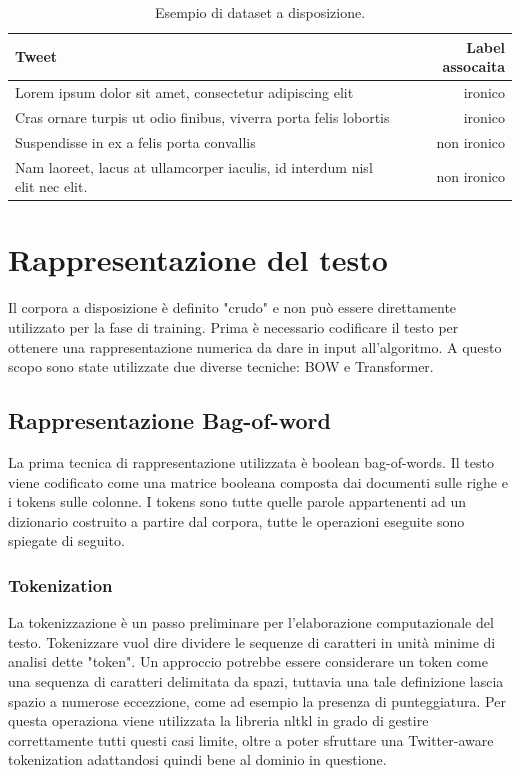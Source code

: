 \documentclass[oneside]{book}
\begin{document}
\begin{table}[h!]
	\centering
	\begin{tabular}[t]{lr}
		\hline
		\textbf{Tweet} & \textbf{Label assocaita}\\
		\hline
		Lorem ipsum dolor sit amet, consectetur adipiscing elit & ironico     \\
		Cras ornare turpis ut odio finibus, viverra porta felis lobortis & ironico \\
		Suspendisse in ex a felis porta convallis & non ironico \\
		Nam laoreet, lacus at ullamcorper iaculis, id interdum nisl elit nec elit. & non ironico \\
		
		\hline
	\end{tabular}
	\caption{Esempio di dataset a disposizione.}
\end{table}%




\section{Rappresentazione del testo}
Il corpora a disposizione è definito "crudo" e non può essere direttamente utilizzato per la fase di training. Prima è necessario codificare il testo per ottenere una rappresentazione numerica da dare in input all'algoritmo. A questo scopo sono state utilizzate due diverse tecniche: BOW e Transformer.

\subsection{Rappresentazione Bag-of-word}
La prima tecnica di rappresentazione utilizzata è boolean bag-of-words.
Il testo viene codificato come una matrice booleana composta dai documenti sulle righe e i tokens sulle colonne. I tokens sono tutte quelle parole appartenenti ad un dizionario costruito a partire dal corpora, tutte le operazioni eseguite sono spiegate di seguito.

\subsubsection{Tokenization}
La tokenizzazione è un passo preliminare per l'elaborazione computazionale del testo. Tokenizzare vuol dire dividere le sequenze di caratteri in unità minime di analisi dette "token". Un approccio potrebbe essere considerare un token come una sequenza di caratteri delimitata da spazi, tuttavia una tale definizione lascia spazio a numerose eccezzione, come ad esempio la presenza di punteggiatura. Per questa operaziona viene utilizzata la libreria
nltkl \cite{nltk} in grado di gestire correttamente tutti questi casi limite, oltre a poter sfruttare una Twitter-aware tokenization adattandosi quindi bene al dominio in questione.
\end{document}
